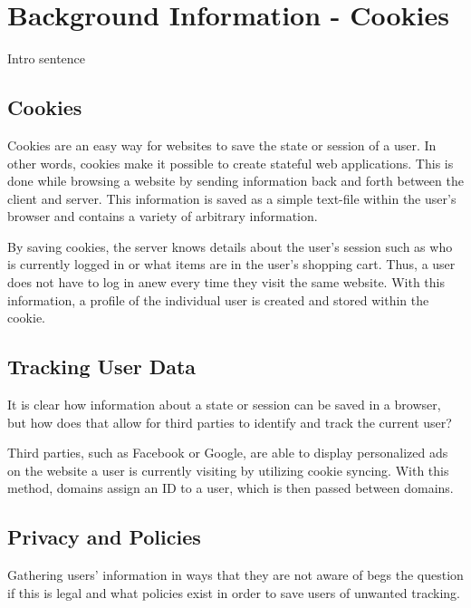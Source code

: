 \chapter{Background Information - Cookies}
\label{ch:bg_cookies}
Intro sentence


%
%
\section{Cookies}
\label{sec:bg_cookies:cookies}
Cookies are an easy way for websites to save the state or session of a user. In other words, cookies make it possible to create stateful web applications. This is done while browsing a website by sending information back and forth between the client and server. This information is saved as a simple text-file within the user's browser and contains a variety of arbitrary information. \cite{cookies1}

By saving cookies, the server knows details about the user's session such as who is currently logged in or what items are in the user's shopping cart. Thus, a user does not have to log in anew every time they visit the same website. With this information, a profile of the individual user is created and stored within the cookie. \cite{cookies1}



%
%
\section{Tracking User Data}
\label{sec:bg_cookies:data}
It is clear how information about a state or session can be saved in a browser, but how does that allow for third parties to identify and track the current user?

Third parties, such as Facebook or Google, are able to display personalized ads on the website a user is currently visiting by utilizing cookie syncing. With this method, domains assign an ID to a user, which is then passed between domains. \cite{cookies2}

%
%
\section{Privacy and Policies}
\label{sec:bg_cookies:privacy}

Gathering users' information in ways that they are not aware of begs the question if this is legal and what policies exist in order to save users of unwanted tracking.

